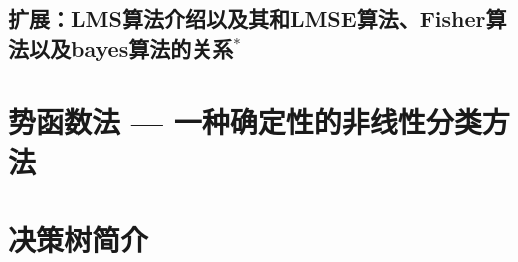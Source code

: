 \documentclass[12pt, letterpaper]{article}
\begin{document}
\subsection{扩展：LMS算法介绍以及其和LMSE算法、Fisher算法以及bayes算法的关系\texorpdfstring{$^*$}{PDFstring}}

\section{势函数法 — 一种确定性的非线性分类方法}
\section{决策树简介}
\end{document}

